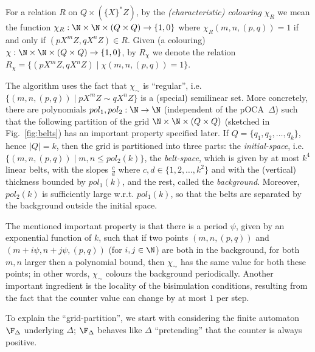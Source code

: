 \begin{definition}
For a
relation $R$ on $Q\times (\{X\}^*Z)$,
by the  \emph{(characteristic) colouring} $\chi_R$ we mean
the function
$\chi_R:\N\times\N\times (Q\times Q)\rightarrow \{1,0\}$
where $\chi_R(m,n,(p,q))=1$ if and only if $(pX^mZ,qX^nZ)\in R$.
Given (a colouring)
$\chi:\N\times\N\times (Q\times Q)\rightarrow\{1,0\}$, by
$R_{\chi}$ we denote the relation
$R_{\chi}=\{(pX^mZ,qX^nZ)\mid \chi(m,n,(p,q))=1\}$.
\end{definition}
The algorithm uses the fact that $\chi_{\sim}$ is ``regular'', i.e.
$\{(m,n,(p,q))\mid p X^mZ\sim qX^nZ\}$ is a (special) semilinear set.
More concretely, there are polynomials $pol_1, pol_2: \N\rightarrow\N$
(independent of the pOCA~$\Delta$) such that the following partition of the grid
$\N\times\N\times (Q\times Q)$
(sketched in Fig.~\ref{fig:belts})
has an important property specified later.
If $Q=\{q_1,q_2,\dots,q_k\}$, hence $|Q|=k$, then the grid is
partitioned into three parts: the \emph{initial-space}, i.e.
$\{(m,n,(p,q))\mid m,n\leq pol_2(k)\}$, the \emph{belt-space},
which is given by at most $k^4$ linear belts, with the slopes $\frac{c}{d}$ where
$c,d\in\{1,2,\dots,k^2\}$ and with the (vertical) thickness bounded by
$pol_1(k)$, and the rest, called the \emph{background}.
Moreover, $pol_2(k)$ is sufficiently large w.r.t. $pol_1(k)$, so that
 the belts are separated by the background
 outside
the initial space.

The mentioned important property is that
there is a period $\psi$, given by an exponential function of $k$,
such that
if two points $(m,n,(p,q))$ and $(m+i\psi,n+j\psi,(p,q))$
(for $i,j\in\N$)
are both in the background, for both $m,n$ larger then a polynomial bound, then
$\chi_{\sim}$ has the same value for both these points; in other words,
$\chi_{\sim}$ colours the background periodically.
Another important ingredient is the locality of the bisimulation conditions,
resulting from the fact that the counter value can change by at most $1$
per step.

To explain the ``grid-partition'', we start with
 considering the finite automaton $\F_{\Delta}$
underlying $\Delta$;
$\F_{\Delta}$ behaves like $\Delta$ ``pretending'' that the
counter is always positive.





